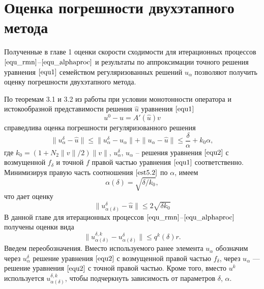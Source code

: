 \newpage
\section{Оценка погрешности двухэтапного метода}

Полученные в главе 1 оценки скорости сходимости для итерационных процессов $\eqref{equ_rmn}$--$\eqref{equ_alphaproc}$ и результаты по аппроксимации точного решения уравнения $\eqref{equ1}$ семейством регуляризованных решений $u_\alpha$ позволяют получить оценку погрешности двухэтапного метода.

По теоремам 3.1 и 3.2 из работы \cite{Tau2002} при условии монотонности оператора и истокообразной представимости решения $\hat{u}$ уравнения $\eqref{equ1}$
\begin{equation}\label{cond5.1}
u^0-\hat{u}=A'(\hat{u})v
\end{equation}
справедлива оценка погрешности регуляризованного решения
\begin{equation}\label{est5.2}
\|u_\alpha^{\delta}-\hat{u}\|\le\|u_\alpha^{\delta}-u_\alpha\|+\|u_\alpha-\hat{u}\|\le\frac{\delta}{\alpha}+k_0\alpha,
\end{equation}
где $k_0=(1+N_2\|v\|/2)\|v\|$, $u_\alpha^{\delta}$, $u_\alpha$ -- решения уравнения $\eqref{equ2}$ с возмущенной $f_\delta$ и точной $f$ правой частью уравнения $\eqref{equ1}$ соответственно. Минимизируя правую часть соотношения $\eqref{est5.2}$ по $\alpha$, имеем 
\begin{equation}\label{est5.21}
	\alpha(\delta)=\sqrt{\delta /k_0},
\end{equation}
что дает оценку
\begin{equation}\label{est5.3}
\|u_{\alpha(\delta)}^{\delta}-\hat{u}\|\le 2\sqrt{\delta k_0}
\end{equation}
В данной главе для итерационных процессов $\eqref{equ_rmn}$--$\eqref{equ_alphaproc}$ получены оценки вида 
\begin{equation}\label{est5.4}
\|u_{\alpha(\delta)}^{\delta, k}-u_{\alpha(\delta)}^{\delta}\|\le q^k(\delta)r.
\end{equation}
Введем переобозначения. Вместо используемого ранее элемента $u_\alpha$ обозначим через $u_\alpha^{\delta}$ решение уравнения $\eqref{equ2}$ с возмущенной правой частью $f_\delta$, через $u_\alpha$ --- решение уравнения $\eqref{equ2}$ с точной правой частью. Кроме того, вместо $u^k$ используется $u_{\alpha(\delta)}^{\delta, k}$, чтобы подчеркнуть зависимость от параметров $\delta$, $\alpha$.

